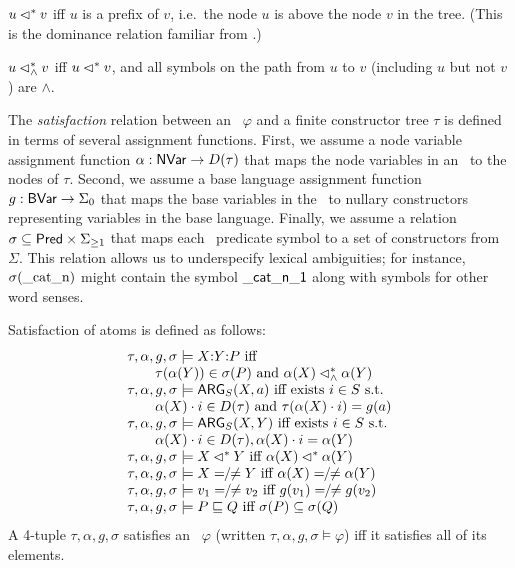 \begin{definition}\label{defn:dominance}
  $u \lhd^* v$ iff $u$ is a prefix of $v$, i.e.\ the node $u$ is above
  the node $v$ in the tree.  (This is the dominance relation familiar
  from .)

  $u \lhd^*_\wedge v$ iff $u \lhd^* v$, and all symbols on the path from $u$
  to $v$ (including $u$ but not $v$) are $\wedge$.
\end{definition}

The {\em satisfaction} relation between an \rmrs\ $\varphi$ and a
finite constructor tree $\tau$ is defined in terms of several
assignment functions.  First, we assume a node variable assignment
function $\alpha: \mathsf{NVar} \rightarrow D(\tau)$ that maps the node
variables in an \rmrs\ to the nodes of $\tau$.  Second, we assume a
base language assignment function $g:\mathsf{BVar} \rightarrow \Sigma_0$ that
maps the base variables in the \rmrs\ to nullary constructors
representing variables in the base language. Finally, we assume a
relation $\sigma \subseteq \mathsf{Pred} \times \Sigma_{\geq 1}$ that maps
each \rmrs\ predicate symbol to a set of constructors from $\Sigma$.
This relation allows us to underspecify lexical ambiguities; for
instance, $\sigma(\mathrm{\_cat\_n})$ might contain the symbol
$\mathsf{\_cat\_n\_1}$ along with symbols for other word senses.

\begin{definition}\label{defn:satisfaction}
Satisfaction of atoms is defined as follows:
$$
\begin{array}{l}
  \tau, \alpha, g, \sigma \models  \ep{X}{Y}{P}
\mbox{ iff}\\
\qquad \tau(\alpha(Y)) \in \sigma(P) \mbox{ and } \alpha(X) \wedgedom
  \alpha(Y) \\
  \tau, \alpha, g, \sigma \models \ARG_S(X,a)
\mbox{ iff exists  $i \in S$ s.t.}\\
\qquad  \alpha(X) \cdot i \in D(\tau) \mbox{ and }
  \tau(\alpha(X) \cdot 
  i) = g(a) \\
  \tau, \alpha, g, \sigma \models \ARG_S(X,Y)
\mbox{ iff  exists $i \in S$ s.t.}\\
\qquad \alpha(X) \cdot i \in D(\tau), \alpha(X) \cdot
  i = \alpha(Y)\\
  \tau, \alpha, g, \sigma \models X \dom Y
\mbox{ iff } \alpha(X) \dom \alpha(Y) \\
  \tau, \alpha, g, \sigma \models X =  \!\!/\!\! \neq Y
\mbox{ iff }  \alpha(X) =  \!\!/\!\! \neq \alpha(Y) \\
  \tau, \alpha, g, \sigma \models v_1 =  \!\!/\!\! \neq v_2
\mbox{ iff }  g(v_1) = \!\!/\!\! \neq g(v_2) \\
  \tau, \alpha, g, \sigma \models P \spec Q
\mbox{ iff $\sigma(P) \subseteq \sigma(Q)$}
\end{array}
$$
A 4-tuple $\tau,\alpha,g,\sigma$ satisfies an \rmrs\ $\varphi$
(written $\tau,\alpha,g,\sigma \models \varphi$) iff it satisfies all
of its elements.
\end{definition}

